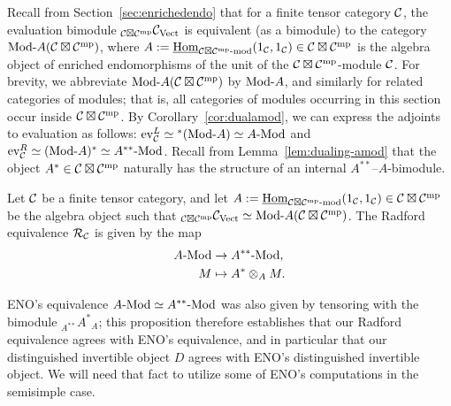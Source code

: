 \documentclass{amsart}
\begin{document}
Recall from Section~\ref{sec:enrichedendo} that for a finite tensor category $\mathcal C$, the evaluation bimodule ${}_{\mathcal C \boxtimes \mathcal C^{\mathrm{mp}}} \mathcal C_{\mathrm{Vect}}$ is equivalent (as a bimodule) to the category $\Mod{}{A}(\cC \boxtimes \cC^\mp)$, where $A := \IHom_{\mod{\cC \boxtimes \cC^\mp}{}}(1_\cC,1_\cC) \in \cC \boxtimes \cC^\mp$ is the algebra object of enriched endomorphisms of the unit of the $\mathcal C \boxtimes \mathcal C^{\mathrm{mp}}$-module $\mathcal C$.  For brevity, we abbreviate $\Mod{}{A}(\cC \boxtimes \cC^\mp)$ by $\Mod{}{A}$, and similarly for related categories of modules; that is, all categories of modules occurring in this section occur inside $\mathcal C \boxtimes \mathcal C^{\mathrm{mp}}$.  By Corollary~\ref{cor:dualamod}, we can express the adjoints to evaluation as follows: $\ev_\cC^L \simeq {}^*(\Mod{}{A}) \simeq \Mod{A}{}$ and $\ev_\cC^R \simeq (\Mod{}{A})^* \simeq \Mod{A^{**}}{}$.  Recall from Lemma~\ref{lem:dualing-amod} that the object $A^* \in \mathcal C \boxtimes \mathcal C^{\mathrm{mp}}$ naturally has the structure of an internal $A^{**}$--$A$-bimodule.
\begin{proposition} \label{prop:computeradford}
Let $\mathcal C$ be a finite tensor category, and let $A := \IHom_{\mod{\cC \boxtimes \cC^\mp}{}}(1_\cC,1_\cC) \in \cC \boxtimes \cC^\mp$ be the algebra object such that ${}_{\cC \boxtimes \cC^\mp} \cC_\Vect \simeq \Mod{}{A}(\cC \boxtimes \cC^\mp)$.  The Radford equivalence $\mathcal R_\mathcal C$ is given by the map
\begin{align*}
\Mod{A}{} &\ra \Mod{A^{**}}{}, \\
M &\mapsto A^* \otimes_A M.
\end{align*}
\end{proposition}
\nid ENO's equivalence $\Mod{A}{} \simeq \Mod{A^{**}}{}$ was also given by tensoring with the bimodule ${}_{A^{**}} {A^*}_A$; this proposition therefore establishes that our Radford equivalence agrees with ENO's equivalence, and in particular that our distinguished invertible object $D$ agrees with ENO's distinguished invertible object.  We will need that fact to utilize some of ENO's computations in the semisimple case.
\end{document}

